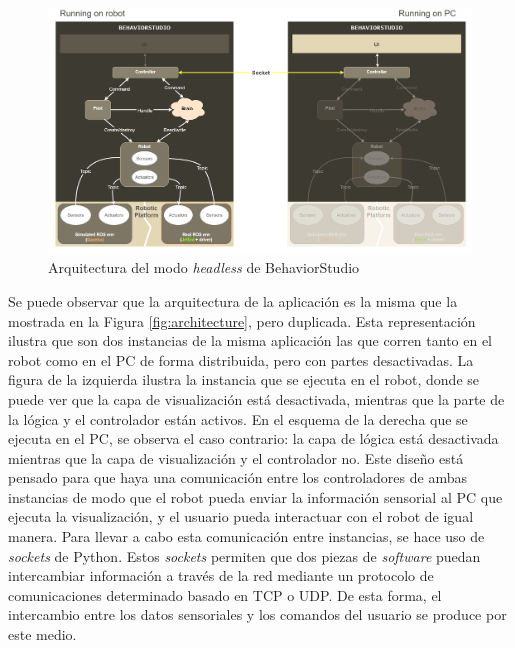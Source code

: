 \begin{figure}
  \centering
  \includegraphics[width=1\linewidth]{img/headless.png}
  \caption{Arquitectura del modo \textit{headless} de BehaviorStudio}
  \label{fig:headless}
\end{figure}

Se puede observar que la arquitectura de la aplicación es la misma que la mostrada en la Figura \ref{fig:architecture}, pero duplicada. Esta representación ilustra que son dos instancias de la misma aplicación las que corren tanto en el robot como en el PC de forma distribuida, pero con partes desactivadas. La figura de la izquierda ilustra la instancia que se ejecuta en el robot, donde se puede ver que la capa de visualización está desactivada, mientras que la parte de la lógica y el controlador están activos. En el esquema de la derecha que se ejecuta en el PC, se observa el caso contrario: la capa de lógica está desactivada mientras que la capa de visualización y el controlador no. Este diseño está pensado para que haya una comunicación entre los controladores de ambas instancias de modo que el robot pueda enviar la información sensorial al PC que ejecuta la visualización, y el usuario pueda interactuar con el robot de igual manera. Para llevar a cabo esta comunicación entre instancias, se hace uso de \textit{sockets} de Python. Estos \textit{sockets} permiten que dos piezas de \textit{software} puedan intercambiar información a través de la red mediante un protocolo de comunicaciones determinado basado en TCP o UDP. De esta forma, el intercambio entre los datos sensoriales y los comandos del usuario se produce por este medio.

